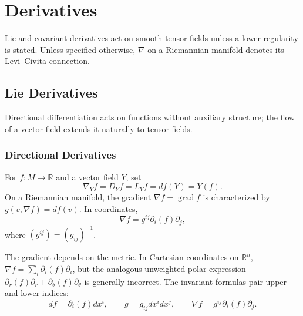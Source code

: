 \chapter{Derivatives}
\label{chap:pet-derivatives}

Lie and covariant derivatives act on smooth tensor fields unless a lower
regularity is stated. Unless specified otherwise, $\nabla$ on a Riemannian
manifold denotes its Levi--Civita connection.

\section{Lie Derivatives}

Directional differentiation acts on functions without auxiliary structure;
the flow of a vector field extends it naturally to tensor fields.

\subsection{Directional Derivatives}

\begin{definition}
  \label{def:pet-ch2-directional-derivative}


  For $f:M\to\mathbb{R}$ and a
  vector field $Y$, set
  \[
    \nabla_Yf=D_Yf=L_Yf=df(Y)=Y(f).
  \]
  On a Riemannian manifold, the gradient
  $\nabla f=\operatorname{grad}f$ is characterized by
  $g(v,\nabla f)=df(v)$. In coordinates,
  \[
    \nabla f=g^{ij}\partial_i(f)\partial_j,
  \]
  where $(g^{ij})=(g_{ij})^{-1}$.
\end{definition}

\begin{remark}
  \label{rem:pet-ch2-gradient-not-invariant}


  The gradient depends on the
  metric. In Cartesian coordinates on $\mathbb{R}^n$,
  $\nabla f=\sum_i\partial_i(f)\partial_i$, but the analogous unweighted
  polar expression
  $\partial_r(f)\partial_r+\partial_\theta(f)\partial_\theta$ is generally
  incorrect. The invariant formulas pair upper and lower indices:
  \[
    df=\partial_i(f)dx^i,\qquad
    g=g_{ij}dx^i dx^j,\qquad
    \nabla f=g^{ij}\partial_i(f)\partial_j.
  \]
\end{remark}

